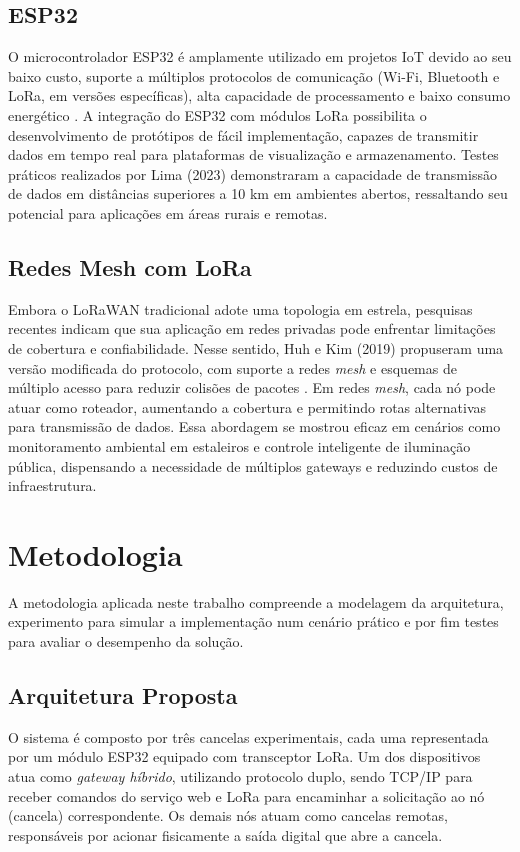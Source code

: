 \documentclass[
article,			%
11pt,				%
twoside,			%
a4paper,			%
section=TITLE,		%
onecolumn,          %
english,			%
brazil,				%
sumario=tradicional
]{abntex2}
\begin{document}
    \subsection{ESP32}
    O microcontrolador ESP32 é amplamente utilizado em projetos IoT devido ao seu baixo custo, suporte a múltiplos protocolos de comunicação (Wi-Fi, Bluetooth e LoRa, em versões específicas), alta capacidade de processamento e baixo consumo energético \cite{lima2023}. A integração do ESP32 com módulos LoRa possibilita o desenvolvimento de protótipos de fácil implementação, capazes de transmitir dados em tempo real para plataformas de visualização e armazenamento. Testes práticos realizados por Lima (2023) demonstraram a capacidade de transmissão de dados em distâncias superiores a 10 km em ambientes abertos, ressaltando seu potencial para aplicações em áreas rurais e remotas.

    \subsection{Redes Mesh com LoRa}
    Embora o LoRaWAN tradicional adote uma topologia em estrela, pesquisas recentes indicam que sua aplicação em redes privadas pode enfrentar limitações de cobertura e confiabilidade. Nesse sentido, Huh e Kim (2019) propuseram uma versão modificada do protocolo, com suporte a redes \textit{mesh} e esquemas de múltiplo acesso para reduzir colisões de pacotes \cite{huh2019}. Em redes \textit{mesh}, cada nó pode atuar como roteador, aumentando a cobertura e permitindo rotas alternativas para transmissão de dados. Essa abordagem se mostrou eficaz em cenários como monitoramento ambiental em estaleiros e controle inteligente de iluminação pública, dispensando a necessidade de múltiplos gateways e reduzindo custos de infraestrutura.

\section{Metodologia}

    A metodologia aplicada neste trabalho compreende a modelagem da arquitetura, experimento para simular a implementação num cenário prático e por fim testes para avaliar o desempenho da solução.
    
    \subsection{Arquitetura Proposta}
    O sistema é composto por três cancelas experimentais, cada uma representada por um módulo ESP32 equipado com transceptor LoRa. Um dos dispositivos atua como \textit{gateway híbrido}, utilizando protocolo duplo, sendo TCP/IP para receber comandos do serviço web e LoRa para encaminhar a solicitação ao nó (cancela) correspondente. Os demais nós atuam como cancelas remotas, responsáveis por acionar fisicamente a saída digital que abre a cancela.
    
\end{document}
